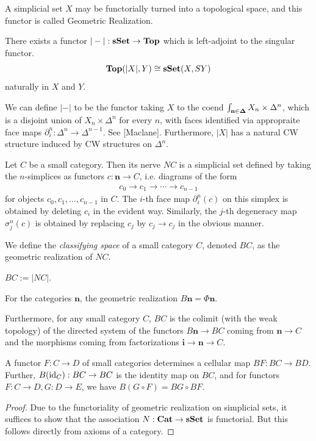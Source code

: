 A simplicial set $X$ may be functorially turned into a topological space, and this functor is called Geometric Realization.
\begin{proposition}
There exists a functor $|-| : \mathbf{sSet} \to \mathbf{Top}$ which is left-adjoint to the singular functor. 
\[
\mathbf{Top}(|X|,Y) \cong \mathbf{sSet}(X, SY)
\]
naturally in $X$ and $Y$.
\end{proposition}
We can define $|-|$ to be the functor taking $X$ to the coend $\int_{\mathbf n \in \mathbf{\Delta}} X_n \times \Delta^n$,
which is a disjoint union of $X_n \times \Delta^n$ for every $n$, with faces identified via appropraite face maps 
$\partial^n_i : \Delta^n \to \Delta^{n-1}$.
See [Maclane].
Furthermore, $|X|$ has a natural CW structure induced by CW structures on $\Delta^n$. 

\begin{definition}
Let $C$ be a small category. Then its nerve $NC$ is a simplicial set defined by
taking the $n$-simplices as functors $c : \mathbf{n} \to C$, i.e. diagrams of the form 
\begin{align*}
  c_0 \to c_1 \to \cdots \to c_{n-1} 
\end{align*}
for objects $c_0, c_1, \ldots, c_{n-1}$ in $C$.
The $i$-th face map $\partial^n_i(c)$ on this simplex is obtained by deleting $c_i$ in the evident way.
Similarly, the $j$-th degeneracy map $\sigma^n_j(c)$ is obtained by replacing $c_j$ by $c_j \to c_j$ in the obvious manner.
\end{definition}

We define the \emph{classifying space} of a small category $C$, denoted $BC$, as the geometric realization of $NC$.
\begin{definition}
  $BC := |NC|$.
\end{definition}

\begin{example}
For the categories $\mathbf n$, the geometric realization $B \mathbf n = \Phi \mathbf n$.
\end{example}
Furthermore, for any small category $C$, $BC$ is the colimit (with the weak topology) of 
the directed system of the functors $B \mathbf n \to BC$ coming from $\mathbf n \to C$ and the   
morphisms coming from factorizations $\mathbf i \to \mathbf n \to C$.

\begin{proposition}\label{Bfunctorial}
A functor $F : C \to D$ of small categories determines a cellular map $BF : BC \to BD$. Further,
$B(\operatorname*{id}_C) : BC \to BC$ is the identity map on $BC$, and for functors $F : C \to D, G : D \to E$, we have
$B(G \circ F) = BG \circ BF$.
\end{proposition}
\begin{proof}
Due to the functoriality of geometric realization on simplicial sets, it suffices to show that
the association $N : \mathbf{Cat} \to \mathbf{sSet}$ is functorial. But this follows directly from axioms of a category.
\end{proof}

